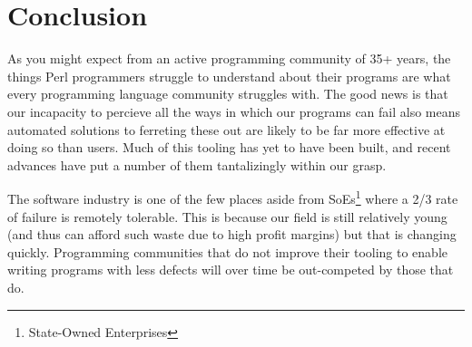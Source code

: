 \documentclass{article}
\begin{document}
\newpage
\section{Conclusion}

As you might expect from an active programming community of 35+ years, the things Perl programmers struggle to understand about their programs are what every programming language community struggles with.
The good news is that our incapacity to percieve all the ways in which our programs can fail also means automated solutions to ferreting these out are likely to be far more effective at doing so than users.
Much of this tooling has yet to have been built, and recent advances have put a number of them tantalizingly within our grasp.

The software industry is one of the few places aside from SoEs\footnote{State-Owned Enterprises} where a 2/3 rate of failure \cite{standish} is remotely tolerable.
This is because our field is still relatively young (and thus can afford such waste due to high profit margins) but that is changing quickly.
Programming communities that do not improve their tooling to enable writing programs with less defects will over time be out-competed by those that do.

\newpage


\end{document}
